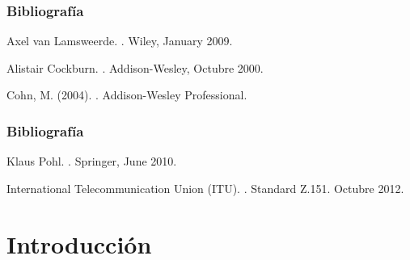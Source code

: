 \documentclass[slidestop,xcolor=pst,dvips,blue]{beamer}
\begin{document}
\begin{frame}[c]
    \frametitle{Bibliografía}
    \begin{thebibliography}{1}
Axel van Lamsweerde.
.
\newblock Wiley, January 2009.

Alistair Cockburn.
.
\newblock Addison-Wesley, Octubre 2000.

Cohn, M. (2004).
.
\newblock Addison-Wesley Professional.

\end{thebibliography}
\end{frame}

\begin{frame}[c]
    \frametitle{Bibliografía}
    \begin{thebibliography}{1}

Klaus Pohl.
.
\newblock Springer, June 2010.

International Telecommunication Union (ITU).
.
\newblock Standard Z.151. Octubre 2012.

\end{thebibliography}
\end{frame}

\section{Introducción}
\end{document}
